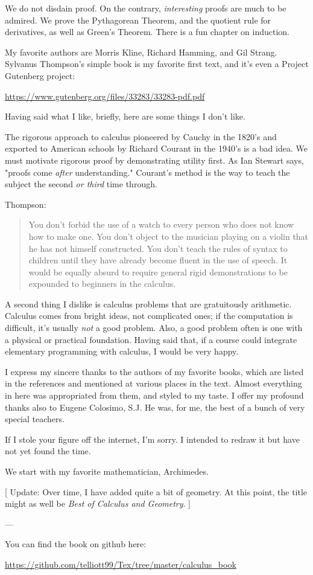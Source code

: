 \documentclass[11pt, oneside]{article}
\begin{document}
We do not disdain proof.  On the contrary, \emph{interesting} proofs are much to be admired.  We prove the Pythagorean Theorem, and the quotient rule for derivatives, as well as Green's Theorem.  There is a fun chapter on induction.

My favorite authors are Morris Kline, Richard Hamming, and Gil Strang.  Sylvanus Thompson's simple book is my favorite first text, and it's even a Project Gutenberg project:

\url{https://www.gutenberg.org/files/33283/33283-pdf.pdf}

Having said what I like, briefly, here are some things I don't like.

The rigorous approach to calculus pioneered by Cauchy in the 1820's and exported to American schools by Richard Courant in the 1940's is a bad idea.  We must motivate rigorous proof by demonstrating utility first.  As Ian Stewart says, "proofs come \emph{after} understanding."  Courant's method is the way to teach the subject the second  \emph{or third} time through.

Thompson:

\begin{quote}
You don't forbid the use of a watch to every person who does not know how to make one. You don't object to the musician playing on a violin that he has not himself constructed. You don't teach the rules of syntax to children until they have already become fluent in the use of speech. It would be equally absurd to require general rigid demonstrations to be expounded to beginners in the calculus.\end{quote}

A second thing I dislike is calculus problems that are gratuitously arithmetic.  Calculus comes from bright ideas, not complicated ones;  if the computation is difficult, it's usually \emph{not} a good problem.  Also, a good problem often is one with a physical or practical foundation.  Having said that, if a course could integrate elementary programming with calculus, I would be very happy.

I express my sincere thanks to the authors of my favorite books, which are listed in the references and mentioned at various places in the text.  Almost everything in here was appropriated from them, and styled to my taste.  I offer my profound thanks also to Eugene Colosimo, S.J.  He was, for me, the best of a bunch of very special teachers.

If I stole your figure off the internet, I'm sorry.  I intended to redraw it but have not yet found the time.  

We start with my favorite mathematician, Archimedes.

[ Update:  Over time, I have added quite a bit of geometry.  At this point, the title might as well be \emph{Best of Calculus and Geometry}. ]

---

You can find the book on github here:

\url{https://github.com/telliott99/Tex/tree/master/calculus_book}
\end{document}

